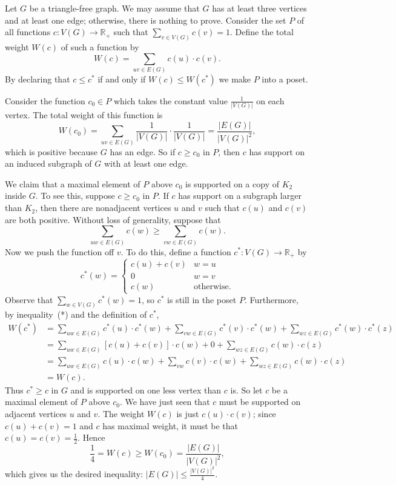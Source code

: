 \documentclass[12pt]{article}
\begin{document}

Let $G$ be a triangle-free graph.  We may assume that $G$ has at least three vertices and at least one edge; otherwise, there is nothing to prove.  Consider the set $P$ of all functions $c\colon V(G)\to\mathbb{R}_+$ such that $\sum_{v\in V(G)} c(v)=1$.  Define the total weight $W(c)$ of such a function by
\[
W(c) = \sum_{uv\in E(G)} c(u)\cdot c(v).
\]
By declaring that $c\le c^*$ if and only if $W(c)\le W(c^*)$ we make $P$ into a poset.

Consider the function $c_0\in P$ which takes the constant value $\frac{1}{|V(G)|}$ on each vertex.  The total weight of this function is
\[
W(c_0) = \sum_{uv\in E(G)} \frac{1}{|V(G)|}\cdot\frac{1}{|V(G)|}=\frac{|E(G)|}{|V(G)|^2},
\]
which is positive because $G$ has an edge.  So if $c\ge c_0$ in $P$, then $c$ has support on an induced subgraph of $G$ with at least one edge.

We claim that a maximal element of $P$ above $c_0$ is supported on a copy of $K_2$ inside $G$.  To see this, suppose $c\ge c_0$ in $P$.  If $c$ has support on a subgraph larger than $K_2$, then there are nonadjacent vertices $u$ and $v$ such that $c(u)$ and $c(v)$ are both positive.  Without loss of generality, suppose that
\begin{equation*}
\sum_{uw\in E(G)} c(w) \ge \sum_{vw\in E(G)} c(w).\tag{*}
\end{equation*}
Now we push the function off $v$.  To do this, define a function $c^*\colon V(G)\to\mathbb{R}_+$ by
\[
c^*(w) = \begin{cases}
c(u)+c(v) & w=u \\
0         & w=v \\
c(w)      & \text{otherwise.}
\end{cases}
\]
Observe that $\sum_{w\in V(G)} c^*(w) = 1$, so $c^*$ is still in the poset $P$.
Furthermore, by inequality~(*) and the definition of $c^*$,
\begin{align*}
W(c^*)
&= \sum_{uw\in E(G)} c^*(u)\cdot c^*(w) + \sum_{vw\in E(G)} c^*(v)\cdot c^*(w) + \sum_{wz\in E(G)} c^*(w)\cdot c^*(z) \\
&= \sum_{uw\in E(G)} [c(u) + c(v)]\cdot c(w) + 0 + \sum_{wz\in E(G)} c(w)\cdot c(z) \\
&= \sum_{uw\in E(G)} c(u) \cdot c(w) + \sum_{vw} c(v)\cdot c(w) + \sum_{wz\in E(G)} c(w) \cdot c(z) \\
&= W(c).
\end{align*}
Thus $c^*\ge c$ in $G$ and is supported on one less vertex than $c$ is.  So let $c$ be a maximal element of $P$ above $c_0$.  We have just seen that $c$ must be supported on adjacent vertices $u$ and $v$.  The weight $W(c)$ is just $c(u)\cdot c(v)$; since $c(u)+c(v)=1$ and $c$ has maximal weight, it must be that $c(u)=c(v)=\frac{1}{2}$.  Hence
\[
\frac{1}{4}=W(c)\ge W(c_0)=\frac{|E(G)|}{|V(G)|^2},
\]
which gives us the desired inequality: $|E(G)|\le\frac{|V(G)|^2}{4}$.

\end{document}
